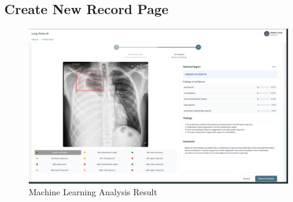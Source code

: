 \documentclass[12pt, titlepage]{article}
\begin{document}
\newpage
\subsection{Create New Record Page}
  \begin{figure}[ht!] 
    \centering
    \includegraphics[scale=0.25]{../assets/analysis_result.png}
    \caption{Machine Learning Analysis Result}
    \label{fig:new_record_4}
  \end{figure}
\end{document}
